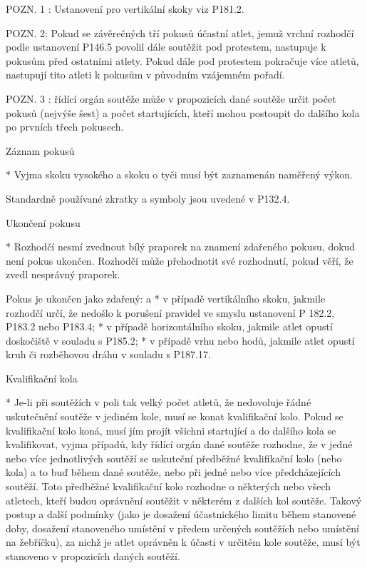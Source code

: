 POZN. 1 : Ustanovení pro vertikální skoky viz P181.2.

POZN. 2:  Pokud se závěrečných tří pokusů účastní atlet, jemuž vrchní rozhodčí podle ustanovení P146.5 povolil dále soutěžit pod protestem, nastupuje k pokusům před ostatními atlety. Pokud dále pod protestem pokračuje více atletů, nastupují tito atleti k pokusům v  původním vzájemném pořadí.

POZN. 3 : řídící orgán soutěže může v propozicích dané soutěže určit počet pokusů (nejvýše šest) a počet startujících, kteří mohou postoupit do dalšího kola po prvních třech pokusech.

Záznam pokusů

* Vyjma skoku vysokého a skoku o tyči musí být zaznamenán naměřený výkon.

Standardně používané zkratky a symboly jsou uvedené v P132.4.

Ukončení pokusu

* Rozhodčí nesmí zvednout bílý praporek na znamení zdařeného pokusu, dokud není pokus ukončen. Rozhodčí může přehodnotit své rozhodnutí, pokud věří, že zvedl nesprávný praporek.

Pokus je ukončen jako zdařený:
  \begitems \style a
  * v případě vertikálního skoku, jakmile rozhodčí určí, že nedošlo k porušení pravidel ve smyslu ustanovení P 182.2, P183.2 nebo P183.4;
  * v případě horizontálního skoku, jakmile atlet opustí doskočiště v souladu s P185.2;
  * v případě vrhu nebo hodů, jakmile atlet opustí kruh či rozběhovou dráhu v souladu s P187.17.
  \enditems

Kvalifikační kola

* Je-li při soutěžích v poli tak velký počet atletů, že nedovoluje řádné uskutečnění soutěže v jediném kole, musí se konat kvalifikační kolo. Pokud se kvalifikační kolo koná, musí jím projít všichni startující a do dalšího kola se kvalifikovat, vyjma případů, kdy řídící orgán dané soutěže rozhodne, že v jedné nebo více jednotlivých soutěží se uskuteční předběžné kvalifikační kolo (nebo kola) a to buď během dané soutěže, nebo při jedné nebo více předcházejících soutěží. Toto předběžné kvalifikační kolo rozhodne o některých nebo všech atletech, kteří budou oprávnění soutěžit v některém z dalších kol soutěže. Takový postup a další podmínky (jako je dosažení účastnického limitu během stanovené doby, dosažení stanoveného umístění v předem určených soutěžích nebo umístění na žebříčku), za nichž je atlet oprávněn k účasti v určitém kole soutěže, musí být stanoveno v propozicích daných soutěží.

